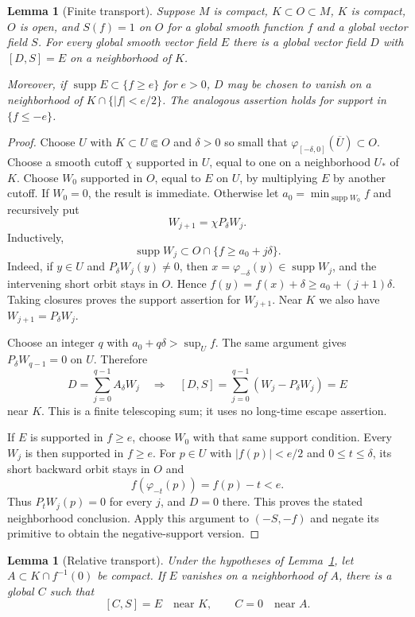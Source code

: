 \documentclass[11pt]{article}
\newtheorem{lemma}[theorem]{Lemma}
\theoremstyle{remark}
\begin{document}
\begin{lemma}[Finite transport]\label{lem:finite}
Suppose $M$ is compact, $K\subset O\subset M$, $K$ is compact, $O$ is open, and $S(f)=1$ on $O$ for a global smooth function $f$ and a global vector field $S$. For every global smooth vector field $E$ there is a global vector field $D$ with
$[D,S]=E$ on a neighborhood of $K$.

Moreover, if $\operatorname{supp}E\subset\{f\ge e\}$ for $e>0$, $D$ may be chosen to vanish on a neighborhood of $K\cap\{|f|<e/2\}$. The analogous assertion holds for support in $\{f\le-e\}$.
\end{lemma}

\begin{proof}
Choose $U$ with $K\subset U\Subset O$ and $\delta>0$ so small that $\varphi_{[-\delta,0]}(\overline U)\subset O$. Choose a smooth cutoff $\chi$ supported in $U$, equal to one on a neighborhood $U_*$ of $K$. Choose $W_0$ supported in $O$, equal to $E$ on $U$, by multiplying $E$ by another cutoff. If $W_0=0$, the result is immediate. Otherwise let $a_0=\min_{\operatorname{supp}W_0}f$ and recursively put
$$
 W_{j+1}=\chi P_\delta W_j.
$$
Inductively,
$$
 \operatorname{supp}W_j\subset O\cap\{f\ge a_0+j\delta\}.
$$
Indeed, if $y\in U$ and $P_\delta W_j(y)\ne0$, then $x=\varphi_{-\delta}(y)\in\operatorname{supp}W_j$, and the intervening short orbit stays in $O$. Hence $f(y)=f(x)+\delta\ge a_0+(j+1)\delta$. Taking closures proves the support assertion for $W_{j+1}$. Near $K$ we also have $W_{j+1}=P_\delta W_j$.

Choose an integer $q$ with $a_0+q\delta>\sup_U f$. The same argument gives $P_\delta W_{q-1}=0$ on $U$. Therefore
$$
 D=\sum_{j=0}^{q-1}A_\delta W_j
 \quad\Longrightarrow\quad
 [D,S]=\sum_{j=0}^{q-1}(W_j-P_\delta W_j)=E
$$
near $K$. This is a finite telescoping sum; it uses no long-time escape
assertion.

If $E$ is supported in $f\ge e$, choose $W_0$ with that same support condition. Every $W_j$ is then supported in $f\ge e$. For $p\in U$ with $|f(p)|<e/2$ and $0\le t\le\delta$, its short backward orbit stays in $O$ and
$$
 f(\varphi_{-t}(p))=f(p)-t<e.
$$
Thus $P_tW_j(p)=0$ for every $j$, and $D=0$ there. This proves the stated neighborhood conclusion. Apply this argument to $(-S,-f)$ and negate its primitive to obtain the negative-support version.
\end{proof}

\begin{lemma}[Relative transport]\label{lem:relative}
Under the hypotheses of Lemma~\ref{lem:finite}, let $A\subset K\cap f^{-1}(0)$ be compact. If $E$ vanishes on a neighborhood of $A$, there is a global $C$ such that
$$
 [C,S]=E\quad\text{near }K,\qquad C=0\quad\text{near }A.
$$
\end{lemma}
\end{document}
